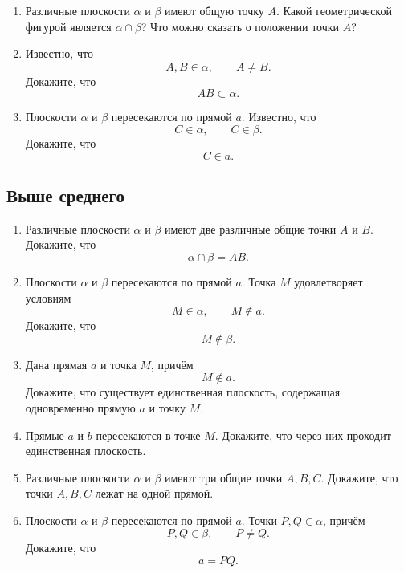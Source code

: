 \documentclass[a4paper,12pt]{article}
\begin{document}
\begin{enumerate}[label=\textbf{\arabic*.}]

  \item
  Различные плоскости \(\alpha\) и \(\beta\)
  имеют общую точку \(A\).
  Какой геометрической фигурой является
  \(\alpha\cap\beta\)?
  Что можно сказать о положении точки \(A\)?

  \item
  Известно, что
  \[
  A,B\in\alpha,\qquad A\ne B.
  \]
  Докажите, что
  \[
  AB\subset\alpha.
  \]

  \item
  Плоскости \(\alpha\) и \(\beta\)
  пересекаются по прямой \(a\).
  Известно, что
  \[
  C\in\alpha,\qquad C\in\beta.
  \]
  Докажите, что
  \[
  C\in a.
  \]

\end{enumerate}

\subsection*{Выше среднего}

\begin{enumerate}[label=\textbf{\arabic*.},start=4]

  \item
  Различные плоскости \(\alpha\) и \(\beta\)
  имеют две различные общие точки \(A\) и \(B\).
  Докажите, что
  \[
  \alpha\cap\beta=AB.
  \]

  \item
  Плоскости \(\alpha\) и \(\beta\)
  пересекаются по прямой \(a\).
  Точка \(M\) удовлетворяет условиям
  \[
  M\in\alpha,\qquad M\notin a.
  \]
  Докажите, что
  \[
  M\notin\beta.
  \]

  \item
  Дана прямая \(a\) и точка \(M\), причём
  \[
  M\notin a.
  \]
  Докажите, что существует единственная плоскость,
  содержащая одновременно прямую \(a\) и точку \(M\).

  \item
  Прямые \(a\) и \(b\) пересекаются в точке \(M\).
  Докажите, что через них проходит единственная плоскость.

  \item
  Различные плоскости \(\alpha\) и \(\beta\)
  имеют три общие точки \(A,B,C\).
  Докажите, что точки \(A,B,C\) лежат на одной прямой.

  \item
  Плоскости \(\alpha\) и \(\beta\) пересекаются по прямой \(a\).
  Точки \(P,Q\in\alpha\), причём
  \[
  P,Q\in\beta,\qquad P\ne Q.
  \]
  Докажите, что
  \[
  a=PQ.
  \]

\end{enumerate}
\end{document}
